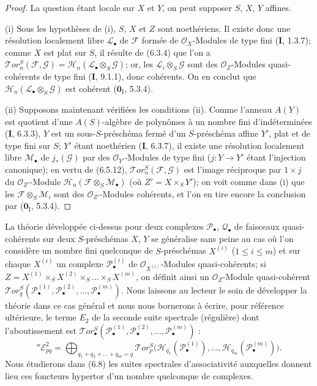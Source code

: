 \begin{proof}
La question étant locale sur $X$ et $Y$, on peut supposer $S$, $X$, $Y$
affines.

\textnormal{(i)} Sous les hypothèses de (i), $S$, $X$ et $Z$ sont noethériens.
Il existe donc une résolution localement libre $\mathscr L_\bullet$ de
$\mathscr F$ formée de $\mathscr O_X$-Modules de type fini (\textbf{I}, 1.3.7); comme
$X$ est plat sur $S$, il résulte de (6.3.4) que l'on a
$\mathscr{T}\!or_n^S(\mathscr F,\mathscr G)
=\mathscr H_n(\mathscr L_\bullet\otimes_S\mathscr G)$;
or, les $\mathscr L_i\otimes_S\mathscr G$ sont des $\mathscr O_Z$-Modules
quasi-cohérents de type fini (\textbf{I}, 9.1.1), donc cohérents. On en conclut que
$\mathscr H_n(\mathscr L_\bullet\otimes_S\mathscr G)$ est cohérent
($\mathbf{0}_{\mathrm I}$, 5.3.4).

\textnormal{(ii)} Supposons maintenant vérifiées les conditions (ii). Comme
l'anneau $A(Y)$ est quotient d'une $A(S)$-algèbre de polynômes à un nombre fini
d'indéterminées (\textbf{I}, 6.3.3), $Y$ est un sous-$S$-préschéma fermé d'un
$S$-préschéma affine $Y'$, plat et de type fini sur $S$; $Y'$ étant noethérien
(\textbf{I}, 6.3.7), il existe une résolution localement libre $\mathscr M_\bullet$ de
$j_*(\mathscr G)$ par des $\mathscr O_{Y'}$-Modules de type fini
($j:Y\to Y'$ étant l'injection canonique); en vertu de (6.5.12),
$\mathscr{T}\!or_n^S(\mathscr F,\mathscr G)$ est l'image réciproque par
$1\times j$ du $\mathscr O_{Z'}$-Module
$\mathscr H_n(\mathscr F\otimes_S\mathscr M_\bullet)$ (où
$Z'=X\times_S Y'$); on voit comme dans (i) que les
$\mathscr F\otimes_S\mathscr M_i$ sont des $\mathscr O_{Z'}$-Modules
cohérents, et l'on en tire encore la conclusion par ($\mathbf{0}_{\mathrm I}$, 5.3.4).
\end{proof}

\begin{env}[6.5.15]
La théorie développée ci-dessus pour deux complexes $\mathscr P_\bullet$,
$\mathscr Q_\bullet$ de faisceaux quasi-cohérents sur deux $S$-préschémas
$X$, $Y$ se généralise sans peine au cas où l'on considère un nombre fini
quelconque de $S$-préschémas $X^{(i)}$ ($1\leqslant i\leqslant m$) et sur
chaque $X^{(i)}$ un complexe $\mathscr P_\bullet^{(i)}$ de
$\mathscr O_{X^{(i)}}$-Modules quasi-cohérents; si
$Z=X^{(1)}\times_S X^{(2)}\times_S\ldots\times_S X^{(m)}$, on définit ainsi un
$\mathscr O_Z$-Module quasi-cohérent
$\mathscr{T}\!or_q^S(\mathscr P_\bullet^{(1)},\mathscr P_\bullet^{(2)},
\ldots,\mathscr P_\bullet^{(m)})$. Nous laissons au lecteur le soin de
développer la théorie dans ce cas général et nous nous bornerons à écrire,
pour référence ultérieure, le terme $E_2$ de la seconde suite spectrale
(régulière) dont l'aboutissement est
$\mathscr{T}\!or_\bullet^S(\mathscr P_\bullet^{(1)},
\mathscr P_\bullet^{(2)},\ldots,\mathscr P_\bullet^{(m)})$ :
\[
  ''\mathscr E_{pq}^2
  =\bigoplus_{q_1+q_2+\ldots+q_m=q}
   \mathscr{T}\!or_p^S
   \bigl(\mathscr H_{q_1}(\mathscr P_\bullet^{(1)}),\ldots,
         \mathscr H_{q_m}(\mathscr P_\bullet^{(m)})\bigr).
  \tag{6.5.15.1}\label{III.6.5.15.1.fr}
\]
Nous étudierons dans (6.8) les suites spectrales d'associativité auxquelles
donnent lieu ces foncteurs hypertor d'un nombre quelconque de complexes.
\end{env}


